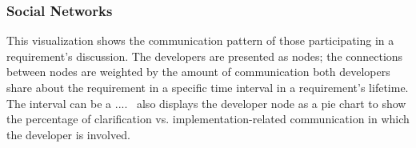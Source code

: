 \subsubsection{Social Networks} 
This visualization shows the communication pattern of those participating in a requirement's discussion. The developers are presented as nodes; the connections between nodes are weighted by the amount of communication both developers share about the requirement in a specific time interval in a requirement's lifetime. The interval can be a ....  
\viss\ also displays the developer node as a pie chart to show the percentage of clarification vs. implementation-related communication in which the developer is involved.





